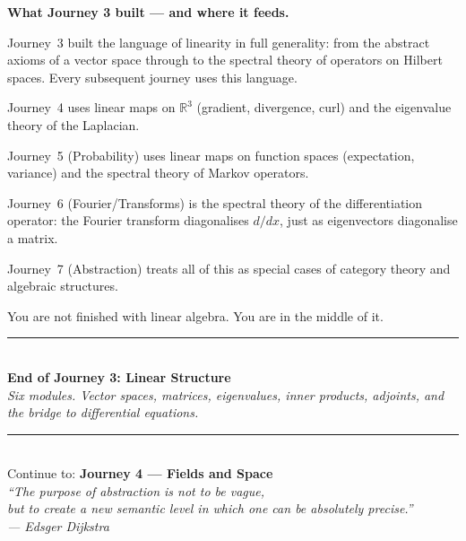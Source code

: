 \documentclass[12pt,a4paper]{article}
\begin{document}
\vspace{0.8cm}
\begin{namebox}
\textbf{What Journey 3 built --- and where it feeds.}

\medskip
Journey~3 built the language of linearity in full generality: from the abstract axioms of a vector space through to the spectral theory of operators on Hilbert spaces. Every subsequent journey uses this language.

Journey~4 uses linear maps on $\mathbb{R}^3$ (gradient, divergence, curl) and the eigenvalue theory of the Laplacian.

Journey~5 (Probability) uses linear maps on function spaces (expectation, variance) and the spectral theory of Markov operators.

Journey~6 (Fourier/Transforms) is the spectral theory of the differentiation operator: the Fourier transform diagonalises $d/dx$, just as eigenvectors diagonalise a matrix.

Journey~7 (Abstraction) treats all of this as special cases of category theory and algebraic structures.

\medskip
You are not finished with linear algebra. You are in the middle of it.
\end{namebox}

\vspace{1cm}
\begin{center}
{\color{Gold}\rule{0.6\linewidth}{1.2pt}}\\[8pt]
{\large\bfseries\color{NavyBlue}End of Journey 3: Linear Structure}\\[6pt]
{\normalsize\color{DarkGrey}\itshape Six modules. Vector spaces, matrices, eigenvalues, inner products, adjoints, and the bridge to differential equations.}\\[10pt]
{\color{Gold}\rule{0.6\linewidth}{1.2pt}}\\[10pt]
{\small\color{DarkGrey}Continue to: \textbf{Journey 4 --- Fields and Space}}\\[4pt]
{\small\color{DarkGrey}\itshape ``The purpose of abstraction is not to be vague,\\but to create a new semantic level in which one can be absolutely precise.''\\
\upshape --- Edsger Dijkstra}
\end{center}
\end{document}
